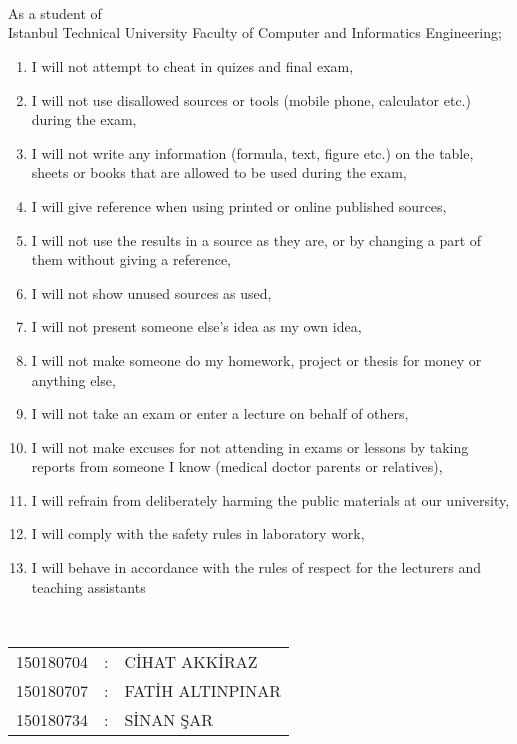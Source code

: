 
\thispagestyle{empty}
\\
\\
\\[0.2cm]
As a student of \\Istanbul Technical University Faculty of Computer and Informatics Engineering;
\begin{enumerate}
    \item I will not attempt to cheat in quizes and final exam,
    \item I will not use disallowed sources or tools (mobile phone, calculator etc.) during the exam,
    \item I will not write any information (formula, text, figure etc.) on the table, sheets or books that are allowed to be used during the exam,
    \item I will give reference when using printed or online published sources,
    \item I will not use the results in a source as they are, or by changing a part of them without giving a reference,
    \item I will not show unused sources as used, 
    \item I will not present someone else’s idea as my own idea, 
    \item I will not make someone do my homework, project or thesis for money or anything else,
    \item I will not take an exam or enter a lecture on behalf of others,
    \item I will not make excuses for not attending in exams or lessons by taking reports from someone I know (medical doctor parents or relatives),
    \item I will refrain from deliberately harming the public materials at our university,  
    \item I will comply with the safety rules in laboratory work,
    \item I will behave in accordance with the rules of respect for the lecturers and teaching assistants
\end{enumerate}
\vspace{-1em}
\\
\vspace{-1em}
\begin{table}[ht]
\centering
\begin{tabular}{rcl}
150180704  & : & C\.{I}HAT AKK\.{I}RAZ \\
150180707  & : & FAT\.{I}H ALTINPINAR \\
150180734  & : & S\.{I}NAN \c{S}AR \\
\end{tabular}
\end{table}
\vspace{-1em}
 \begin{table}[ht]
 \begin{tabular}{lr}
\end{tabular}
\end{table}